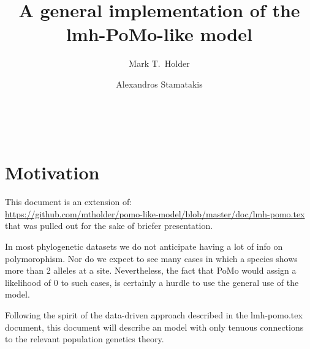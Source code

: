 \documentclass{llncs}
\begin{document}
\title{A general implementation of the lmh-PoMo-like model}
\author{Mark T.~Holder\and Alexandros Stamatakis}
\\
\newcommand\enum{\addtocounter{equation}{1}\tag{\theequation}}
\maketitle              %
\section {Motivation}
This document is an extension of:\\
 \url{https://github.com/mtholder/pomo-like-model/blob/master/doc/lmh-pomo.tex}\\
that was pulled out for the sake of briefer presentation.

In most phylogenetic datasets we do not anticipate having a lot of info
    on polymorophism.
Nor do we expect to see many cases in which a species shows more than 2 alleles
    at a site.
Nevertheless, the fact that PoMo would assign a likelihood of 0 to such cases, is
    certainly a hurdle to use the general use of the model.

Following the spirit of the data-driven approach described in the lmh-pomo.tex document,
    this document will describe an model with only tenuous connections to the relevant
    population genetics theory.
\end{document}
